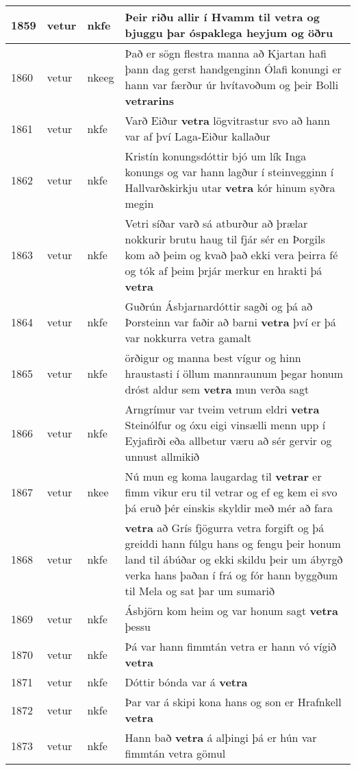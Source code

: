 \documentclass{article}
\begin{document}
\begin{longtable}{p{1cm}|p{1cm}|p{1cm}|p{13cm}}
\hline
1859&vetur&nkfe&Þeir riðu allir í Hvamm til \textbf{vetra} og bjuggu þar óspaklega heyjum og öðru\\
\hline
1860&vetur&nkeeg&Það er sögn flestra manna að Kjartan hafi þann dag gerst handgenginn Ólafi konungi er hann var færður úr hvítavoðum og þeir Bolli \textbf{vetrarins} \\
\hline
1861&vetur&nkfe&Varð Eiður \textbf{vetra} lögvitrastur svo að hann var af því Laga-Eiður kallaður\\
\hline
1862&vetur&nkfe&Kristín konungsdóttir bjó um lík Inga konungs og var hann lagður í steinvegginn í Hallvarðskirkju utar \textbf{vetra} kór hinum syðra megin\\
\hline
1863&vetur&nkfe&Vetri síðar varð sá atburður að þrælar nokkurir brutu haug til fjár sér en Þorgils kom að þeim og kvað það ekki vera þeirra fé og tók af þeim þrjár merkur en hrakti þá \textbf{vetra} \\
\hline
1864&vetur&nkfe&Guðrún Ásbjarnardóttir sagði og þá að Þorsteinn var faðir að barni \textbf{vetra} því er þá var nokkurra vetra gamalt\\
\hline
1865&vetur&nkfe&örðigur og manna best vígur og hinn hraustasti í öllum mannraunum þegar honum dróst aldur sem \textbf{vetra} mun verða sagt\\
\hline
1866&vetur&nkfe&Arngrímur var tveim vetrum eldri \textbf{vetra} Steinólfur og óxu eigi vinsælli menn upp í Eyjafirði eða allbetur væru að sér gervir og unnust allmikið\\
\hline
1867&vetur&nkee&Nú mun eg koma laugardag til \textbf{vetrar} er fimm vikur eru til vetrar og ef eg kem ei svo þá eruð þér einskis skyldir með mér að fara\\
\hline
1868&vetur&nkfe& \textbf{vetra} að Grís fjögurra vetra forgift og þá greiddi hann fúlgu hans og fengu þeir honum land til ábúðar og ekki skildu þeir um ábyrgð verka hans þaðan í frá og fór hann byggðum til Mela og sat þar um sumarið\\
\hline
1869&vetur&nkfe&Ásbjörn kom heim og var honum sagt \textbf{vetra} þessu\\
\hline
1870&vetur&nkfe&Þá var hann fimmtán vetra er hann vó vígið \textbf{vetra} \\
\hline
1871&vetur&nkfe&Dóttir bónda var á \textbf{vetra} \\
\hline
1872&vetur&nkfe&Þar var á skipi kona hans og son er Hrafnkell \textbf{vetra} \\
\hline
1873&vetur&nkfe&Hann bað \textbf{vetra} á alþingi þá er hún var fimmtán vetra gömul\\

\end{longtable}
\end{document}
